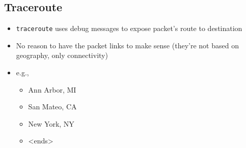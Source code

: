 \subsection{Traceroute}
\begin{itemize}
	\item \lstinline[style=bash]{traceroute} uses debug messages to expose packet's route to destination
	\item No reason to have the packet links to make sense (they're not based on geography, only connectivity)
	\item e.g.,
	\begin{itemize}
		\item Ann Arbor, MI
		\item San Mateo, CA
		\item New York, NY
		\item <ends>
	\end{itemize}
\end{itemize}

